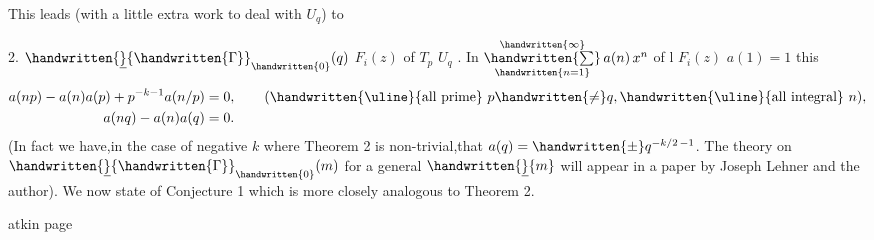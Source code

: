 This leads (with a little extra work to deal with $U_q$) to

 2.  $\handwritten{\underline}{\handwritten{\Gamma}}_{\handwritten{0}}(q)$  $F_i(z)$   of  $T_p$  $U_q$ . In  $\mathop{\handwritten{\sum}}\limits_{\handwritten{n=1}}^{\handwritten{\infty}}a(n)\,x^n$ of l $F_i(z)$  $a(1)=1$ this  
\[
 \begin{aligned}
 a(np)-a(n)a(p)+p^{-k-1}a(n/p)&=0,\qquad (\text{\handwritten{\uline}{all prime} }p\handwritten{\ne}q,\text{\handwritten{\uline}{all integral} } n),\\
 a(nq)-a(n)a(q)&=0. 
 \end{aligned}
\]
\margin{\handwritten{\#}}
(In fact we have,in the case of negative $k$ where Theorem 2 is non-trivial,that $a(q)=\mathbin{\handwritten{\pm}}q^{-k/2\,-1}$. The theory on $\handwritten{\underline}{\handwritten{\Gamma}}_{\handwritten{0}}(m)$ for a general $\handwritten{\underline}{m}$ will appear in a paper by Joseph Lehner and the author). We now state of Conjecture 1 which is more closely analogous to Theorem 2.

\begin{center}atkin page \end{center}

